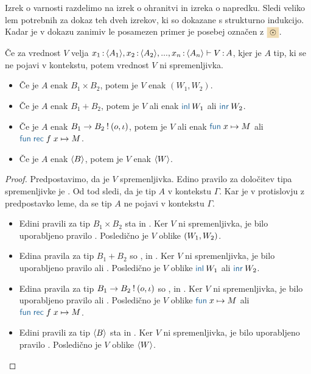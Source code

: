 Izrek o varnosti razdelimo na izrek o ohranitvi in izreka o napredku.
Sledi veliko lem potrebnih za dokaz teh dveh izrekov, ki so dokazane s strukturno indukcijo. Kadar je v dokazu zanimiv le posamezen primer je posebej označen z $\sitem$.


\begin{lema}\label{lem:ni-spremenljivka}
	Če za vrednost $V$ velja $x_1 \mathinner{:} \langle A_1 \rangle, x_2 \mathinner{:} \langle A_2 \rangle, ..., x_n \mathinner{:} \langle A_n \rangle \vdash V \mathinner{:} A$, kjer je $A$ tip, ki se ne pojavi v kontekstu, potem vrednost $V$ ni spremenljivka.
	\begin{itemize}
		\item Če je $A$ enak $B_1 \times B_2$, potem je $V$ enak $(W_1,W_2)$.
		\item Če je $A$ enak $B_1 + B_2$, potem je $V$ ali enak $\tminl{W_1}$ ali $\tminr{W_2}$.
		\item Če je $A$ enak $B_1 \to B_2 \mathbin{!} (o, \iota)$, potem je $V$ ali enak $\tmfunano{x}{M}$ ali $\tmfunrecano{f}{x}{M}$.
		\item Če je $A$ enak $\langle B \rangle$, potem je $V$ enak $\langle W \rangle$.
	\end{itemize}
\end{lema}

\begin{proof}
	Predpostavimo, da je $V$ spremenljivka. Edino pravilo za določitev tipa spremenljivke je .
	Od tod sledi, da je tip $A$ v kontekstu $\Gamma$. Kar je v protislovju z predpostavko leme, da se tip $A$ ne pojavi v kontekstu $\Gamma$.
	\begin{itemize}
		\item Edini pravili za tip $B_1 \times B_2$ sta  in .
		Ker $V$ ni spremenljivka, je bilo uporabljeno pravilo .
		Posledično je $V$ oblike $( W_1 , W_2 )$.
		
		\item Edina pravila za tip $B_1 + B_2$ so ,  in .
		Ker $V$ ni spremenljivka, je bilo uporabljeno pravilo  ali .
		Posledično je $V$ oblike $\tminl{W_1}$ ali $\tminr{W_2}$.
		
		\item Edina pravila za tip $B_1 \to B_2 \mathbin{!} (o, \iota)$ so ,  in .
		Ker $V$ ni spremenljivka, je bilo uporabljeno pravilo  ali .
		Posledično je $V$ oblike $\tmfunano{x}{M}$ ali $\tmfunrecano{f}{x}{M}$.
		
		\item Edini pravili za tip $\langle B \rangle$ sta  in .
		Ker $V$ ni spremenljivka, je bilo uporabljeno pravilo .
		Posledično je $V$ oblike $\langle W \rangle$.
	\end{itemize}
\end{proof}


